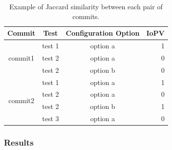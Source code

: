 \begin{table}[t]
\centering
\caption{Example of Jaccard similarity between each pair of commits.}
\begin{tabular}{|c|c|c|r|}
\hline
Commit                   & Test   & Configuration Option     & \multicolumn{1}{c|}{IoPV} \\ \hline
\multirow{3}{*}{commit1} & test 1  & option   a & 1                         \\ \cline{2-4} 
                         & test 2  & option   a & 0                         \\ \cline{2-4} 
                         & test 2  & option   b & 0                         \\ \hline
\multirow{4}{*}{commit2} & test 1 & option   a & 1                         \\ \cline{2-4} 
                         & test 2 & option   a & 0                         \\ \cline{2-4} 
                         & test 2 & option   b & 1                         \\ \cline{2-4} 
                         & test 3 & option   a & 0                         \\ \hline
\end{tabular}
\label{tab:jaccard}
\end{table}



\subsubsection*{Results}

